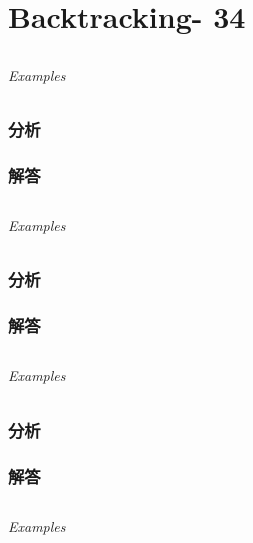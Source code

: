 \documentclass[UTF8,a4paper,12pt]{ctexbook}
\begin{document}
\chapter{Backtracking- 34}
\section{}
	
	\subparagraph{Examples}
	
	\subsection{分析}
	
	\subsection{解答}
	
\section{}
	
	\subparagraph{Examples}
	
	\subsection{分析}
	
	\subsection{解答}
	
\section{}
	
	\subparagraph{Examples}
	
	\subsection{分析}
	
	\subsection{解答}
	
\section{}
	
	\subparagraph{Examples}
	
\end{document}
